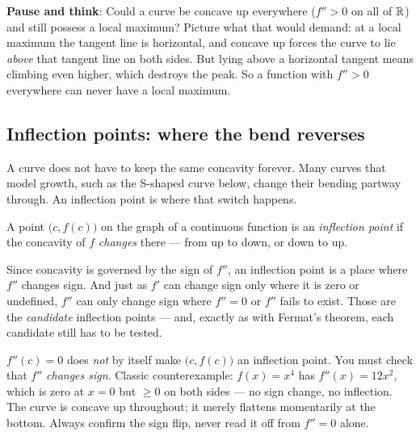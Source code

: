 \begin{recoverybox}
\textbf{Pause and think}: Could a curve be concave up everywhere ($f''>0$ on all of $\mathbb{R}$) and still possess a local maximum? Picture what that would demand: at a local maximum the tangent line is horizontal, and concave up forces the curve to lie \emph{above} that tangent line on both sides. But lying above a horizontal tangent means climbing even higher, which destroys the peak. So a function with $f''>0$ everywhere can never have a local maximum.
\end{recoverybox}

\subsection{Inflection points: where the bend reverses}

A curve does not have to keep the same concavity forever. Many curves that
model growth, such as the S-shaped curve below, change their bending partway
through. An inflection point is where that switch happens.

\begin{definition}\label{ch16:def-inflection}
A point $\big(c,f(c)\big)$ on the graph of a continuous function is an
\emph{inflection point} if the concavity of $f$ \emph{changes} there --- from up to
down, or down to up.
\end{definition}

Since concavity is governed by the sign of $f''$, an inflection point is a place
where $f''$ changes sign. And just as $f'$ can change sign only where it is zero
or undefined,
$f''$ can only change sign where $f''=0$ or $f''$ fails to exist. Those are the
\emph{candidate} inflection points --- and, exactly as with Fermat's theorem,
each candidate still has to be tested.

\begin{trapbox}
$f''(c)=0$ does \emph{not} by itself make $\big(c,f(c)\big)$ an inflection point.
You must check that $f''$ \emph{changes sign}. Classic counterexample:
$f(x)=x^4$ has $f''(x)=12x^2$, which is zero at $x=0$ but $\ge 0$ on both sides ---
no sign change, no inflection. The curve is concave up throughout; it merely
flattens momentarily at the bottom. Always confirm the sign flip, never read it off
from $f''=0$ alone.
\end{trapbox}

